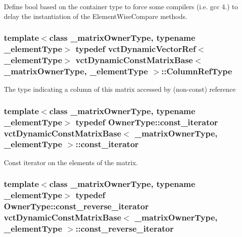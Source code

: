Define bool based on the container type to force some compilers (i.\-e. gcc 4.) to delay the instantiation of the Element\-Wise\-Compare methods. \hypertarget{classvct_dynamic_const_matrix_base_a232026578d12a51aa5228dee998b5663}{
\subsubsection[{Column\-Ref\-Type}]{\setlength{\rightskip}{0pt plus 5cm}template$<$class \-\_\-matrix\-Owner\-Type, typename \-\_\-element\-Type$>$ typedef {\bf vct\-Dynamic\-Vector\-Ref}$<$\-\_\-element\-Type$>$ {\bf vct\-Dynamic\-Const\-Matrix\-Base}$<$ \-\_\-matrix\-Owner\-Type, \-\_\-element\-Type $>$\-::{\bf Column\-Ref\-Type}}}\label{classvct_dynamic_const_matrix_base_a232026578d12a51aa5228dee998b5663}
The type indicating a column of this matrix accessed by (non-\/const) reference \hypertarget{classvct_dynamic_const_matrix_base_a665b16a8ecd8b6febb4d193efa42205e}{
\subsubsection[{const\-\_\-iterator}]{\setlength{\rightskip}{0pt plus 5cm}template$<$class \-\_\-matrix\-Owner\-Type, typename \-\_\-element\-Type$>$ typedef Owner\-Type\-::const\-\_\-iterator {\bf vct\-Dynamic\-Const\-Matrix\-Base}$<$ \-\_\-matrix\-Owner\-Type, \-\_\-element\-Type $>$\-::{\bf const\-\_\-iterator}}}\label{classvct_dynamic_const_matrix_base_a665b16a8ecd8b6febb4d193efa42205e}
Const iterator on the elements of the matrix. \hypertarget{classvct_dynamic_const_matrix_base_afc30420e745eed5f1c838a01088ddc84}{
\subsubsection[{const\-\_\-reverse\-\_\-iterator}]{\setlength{\rightskip}{0pt plus 5cm}template$<$class \-\_\-matrix\-Owner\-Type, typename \-\_\-element\-Type$>$ typedef Owner\-Type\-::const\-\_\-reverse\-\_\-iterator {\bf vct\-Dynamic\-Const\-Matrix\-Base}$<$ \-\_\-matrix\-Owner\-Type, \-\_\-element\-Type $>$\-::{\bf const\-\_\-reverse\-\_\-iterator}}}\label{classvct_dynamic_const_matrix_base_afc30420e745eed5f1c838a01088ddc84}
